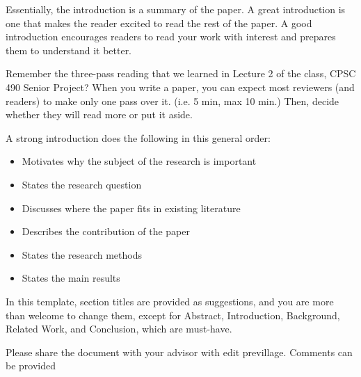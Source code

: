 Essentially, the introduction is a summary of the paper. A great introduction is one that makes the reader excited to read the rest of the paper. A good introduction encourages readers to read your work with interest and prepares them to understand it better. 

Remember the three-pass reading that we learned in Lecture 2 of the class, CPSC 490 Senior Project? 
When you write a paper, you can expect most reviewers (and readers) to make only one pass over it. (i.e. 5 min, max 10 min.) Then, decide whether they will read more or put it aside. 


A strong introduction does the following in this general order:
\begin{itemize}
    \item Motivates why the subject of the research is important
    \item States the research question
    \item Discusses where the paper fits in existing literature
    \item Describes the contribution of the paper
    \item States the research methods
    \item States the main results
\end{itemize}


In this template, section titles are provided as suggestions, and you are more than welcome to change them, except for Abstract, Introduction, Background, Related Work, and Conclusion, which are must-have. 

Please share the document with your advisor with edit previllage. Comments can be provided 